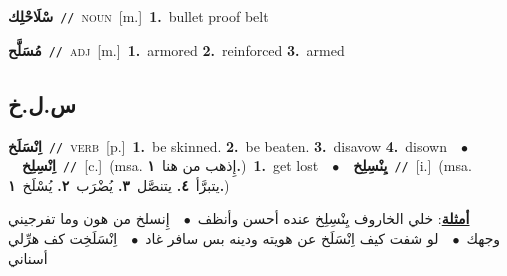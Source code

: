 \documentclass[10pt,a4paper,twoside]{article} %
\begin{document}
\begin{multicols}{2}
{\setlength\topsep{0pt}\textbf{\foreignlanguage{arabic}{سْلَاحْلِك}}\ {\color{gray}\texttt{//}\color{black}}\ \textsc{noun}\ [m.]\ \textbf{1.}~bullet proof belt\ } \vspace{2mm}

{\setlength\topsep{0pt}\textbf{\foreignlanguage{arabic}{مُسَلَّح}}\ {\color{gray}\texttt{//}\color{black}}\ \textsc{adj}\ [m.]\ \textbf{1.}~armored  \textbf{2.}~reinforced  \textbf{3.}~armed\ } \vspace{2mm}

\vspace{-3mm}
\subsection*{\color{blue}\foreignlanguage{arabic}{س.ل.خ}\color{blue}{}} 

{\setlength\topsep{0pt}\textbf{\foreignlanguage{arabic}{اِنْسَلَخ}}\ {\color{gray}\texttt{//}\color{black}}\ \textsc{verb}\ [p.]\ \textbf{1.}~be skinned.  \textbf{2.}~be beaten.  \textbf{3.}~disavow  \textbf{4.}~disown\ \ $\bullet$\ \ \setlength\topsep{0pt}\textbf{\foreignlanguage{arabic}{اِنْسِلِخ}}\ {\color{gray}\texttt{//}\color{black}}\ [c.]\ \color{gray}(msa. \foreignlanguage{arabic}{إِذهب من هنا}~\foreignlanguage{arabic}{\textbf{١.}})\color{black}\ \textbf{1.}~get lost\ \ $\bullet$\ \ \setlength\topsep{0pt}\textbf{\foreignlanguage{arabic}{يِنْسِلِخ}}\ {\color{gray}\texttt{//}\color{black}}\ [i.]\ \color{gray}(msa. \foreignlanguage{arabic}{يتبرَّأ}~\foreignlanguage{arabic}{\textbf{٤.}}  \foreignlanguage{arabic}{يتنصَّل}~\foreignlanguage{arabic}{\textbf{٣.}}  \foreignlanguage{arabic}{يُضْرَب}~\foreignlanguage{arabic}{\textbf{٢.}}  \foreignlanguage{arabic}{يُسْلَخ}~\foreignlanguage{arabic}{\textbf{١.}})\color{black}\  \begin{flushright}\color{gray}\foreignlanguage{arabic}{\textbf{\underline{\foreignlanguage{arabic}{أمثلة}}}: خلي الخاروف يِنْسِلِخ عنده أحسن وأنظف\ $\bullet$\ \  إِنسلخ من هون وما تفرجيني وجهك\ $\bullet$\ \  لو شفت كيف اِنْسَلَخ عن هويته ودينه بس سافر غاد\ $\bullet$\ \  اِنْسَلَخِت كف هرِّلي أسناني}\end{flushright}\color{black}} \vspace{2mm}


\end{multicols}
\end{document}
